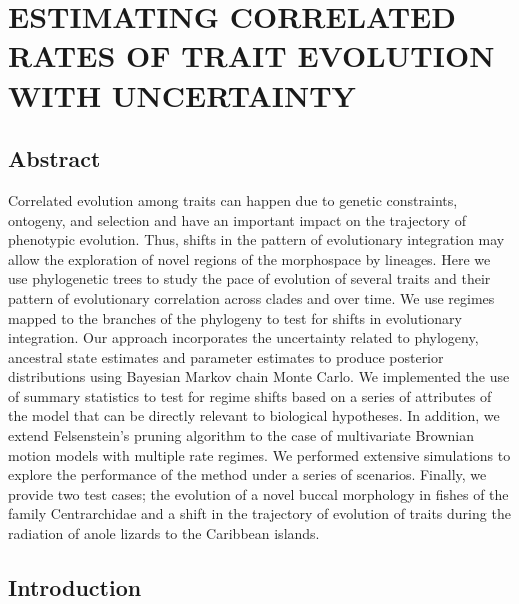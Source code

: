 
\chapter{ESTIMATING CORRELATED RATES OF TRAIT EVOLUTION WITH UNCERTAINTY}

\section{Abstract}

Correlated evolution among traits can happen due to genetic constraints, ontogeny, and selection and have an important impact on the trajectory of phenotypic evolution. Thus, shifts in the pattern of evolutionary integration may allow the exploration of novel regions of the morphospace by lineages. Here we use phylogenetic trees to study the pace of evolution of several traits and their pattern of evolutionary correlation across clades and over time. We use regimes mapped to the branches of the phylogeny to test for shifts in evolutionary integration. Our approach incorporates the uncertainty related to phylogeny, ancestral state estimates and parameter estimates to produce posterior distributions using Bayesian Markov chain Monte Carlo. We implemented the use of summary statistics to test for regime shifts based on a series of attributes of the model that can be directly relevant to biological hypotheses. In addition, we extend Felsenstein's pruning algorithm to the case of multivariate Brownian motion models with multiple rate regimes. We performed extensive simulations to explore the performance of the method under a series of scenarios. Finally, we provide two test cases; the evolution of a novel buccal morphology in fishes of the family Centrarchidae and a shift in the trajectory of evolution of traits during the radiation of anole lizards to the Caribbean islands.

\section{Introduction}


